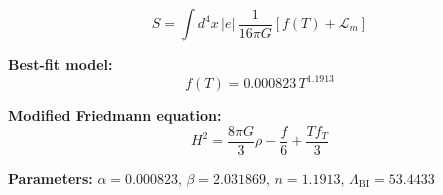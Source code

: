 
\begin{equation}
  S = \int d^4x \, |e| \, \frac{1}{16\pi G} \left[ f(T) + \mathcal{L}_m \right]
\end{equation}

\textbf{Best-fit model:}
\begin{equation}
  f(T) = 0.000823 \, T^{1.1913}
\end{equation}

\textbf{Modified Friedmann equation:}
\begin{equation}
  H^2 = \frac{8\pi G}{3} \rho - \frac{f}{6} + \frac{T f_T}{3}
\end{equation}

\textbf{Parameters:}
$\alpha = 0.000823$, \quad
$\beta = 2.031869$, \quad
$n = 1.1913$, \quad
$\Lambda_{\text{BI}} = 53.4433$